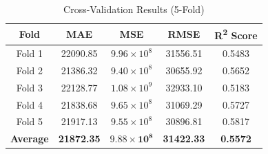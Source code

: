\documentclass{article}
\begin{document}
\begin{table}[H]
\centering
\caption{Cross-Validation Results (5-Fold)}
\label{tab:cv_results}
\begin{tabular}{|c|c|c|c|c|}
\hline
\textbf{Fold} & \textbf{MAE} & \textbf{MSE} & \textbf{RMSE} & \textbf{R\textsuperscript{2} Score} \\
\hline
Fold 1 & 22090.85 & $9.96 \times 10^8$ & 31556.51 & 0.5483 \\
Fold 2 & 21386.32 & $9.40 \times 10^8$ & 30655.92 & 0.5652 \\
Fold 3 & 22128.77 & $1.08 \times 10^9$ & 32933.10 & 0.5183 \\
Fold 4 & 21838.68 & $9.65 \times 10^8$ & 31069.29 & 0.5727 \\
Fold 5 & 21917.13 & $9.55 \times 10^8$ & 30896.81 & 0.5817 \\
\hline
\textbf{Average} & \textbf{21872.35} & $\mathbf{9.88 \times 10^8}$ & \textbf{31422.33} & \textbf{0.5572} \\
\hline
\end{tabular}
\end{table}

\vspace{1cm}
\end{document}
